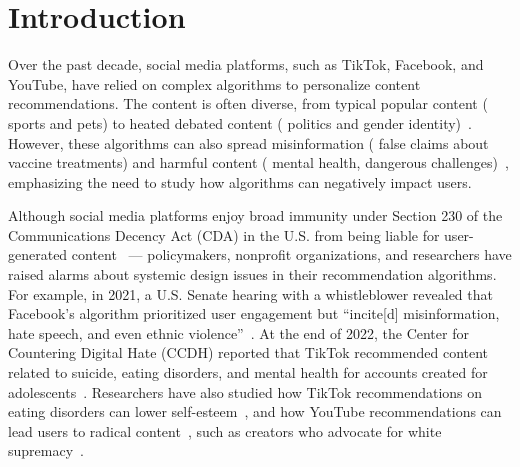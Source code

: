 \section{Introduction}
\label{sec:autolike-introduction}

Over the past decade, social media platforms, such as TikTok, Facebook, and YouTube, have relied on complex algorithms to personalize content recommendations. 
The content is often diverse, from typical popular content (\eg{} sports and pets) to heated debated content (\eg{} politics and gender identity)~\cite{Meta2025}. However, these algorithms can also spread misinformation (\eg{} false claims about vaccine treatments) and harmful content (\eg{} mental health, dangerous challenges)~\cite{Funke-covid-misinfo,arstech-parents-sue-tiktok}, emphasizing the need to study how algorithms can negatively impact users.  

Although social media platforms enjoy broad immunity under Section 230 of the Communications Decency Act (CDA) in the U.S. from being liable for user-generated content~\cite{section230} --- policymakers, nonprofit organizations, and researchers have raised alarms about systemic design issues in their recommendation algorithms. 
For example, in 2021, a U.S. Senate hearing with a whistleblower revealed that Facebook's algorithm prioritized user engagement but ``incite[d] misinformation, hate speech, and even ethnic violence''~\cite{Hao2021Jun}.
At the end of 2022, the Center for Countering Digital Hate (CCDH) reported that TikTok recommended content related to suicide, eating disorders, and mental health for accounts created for adolescents~\cite{tiktok-hate-ccdh}. Researchers have also studied how TikTok recommendations on eating disorders can lower self-esteem~\cite{Pruccoli2022Dec}, and how YouTube recommendations can lead users to radical content~\cite{haroon2022youtube,HosseinmardiYoutubeRadical}, such as creators who advocate for white supremacy~\cite{RibeiroYoutubePathways}.  

